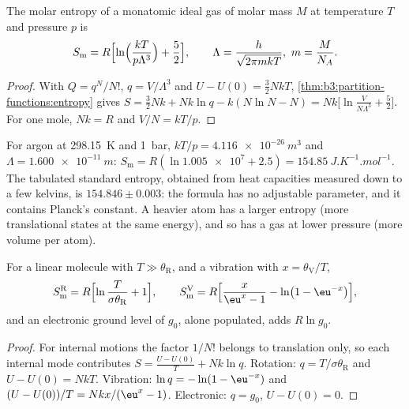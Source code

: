 \begin{theorem}\label{thm:b3:partition-functions:sackur-tetrode}
The molar entropy of a monatomic ideal gas of molar mass $M$ at temperature $T$
and pressure $p$ is
\[
  S_{\mathrm m} = R\Bigl[\ln\Bigl(\frac{kT}{p\Lambda^3}\Bigr) + \frac52\Bigr],
  \qquad \Lambda = \frac{h}{\sqrt{2\pi mkT}},\ m = \frac{M}{N_A}.
\]
\end{theorem}

\begin{proof}
With $Q = q^N/N!$, $q = V/\Lambda^3$ and $U - U(0) = \frac32NkT$,
\cref{thm:b3:partition-functions:entropy} gives $S = \frac32Nk + Nk\ln q - k(N\ln N - N) =
Nk\bigl[\ln\frac{V}{N\Lambda^3} + \frac52\bigr]$. For one mole, $Nk = R$ and $V/N = kT/p$.
\end{proof}

For argon at \qty{298.15}{K} and \qty{1}{bar}, $kT/p = \qty{4.116e-26}{m^3}$ and $\Lambda =
\qty{1.600e-11}{m}$: $S_{\mathrm m} = R(\ln\num{1.005e7} + 2.5) = \qty{154.85}{J.K^{-1}.mol^{-1}}$. The
tabulated standard entropy, obtained from heat capacities measured down to a
few kelvins, is $154.846 \pm 0.003$: the formula has no adjustable parameter, and
it contains Planck's constant. A heavier atom has a larger entropy (more
translational states at the same energy), and so has a gas at lower pressure
(more volume per atom).

\begin{proposition}\label{prop:b3:partition-functions:modes-entropy}
For a linear molecule with $T \gg \theta_{\mathrm R}$, and a vibration with $x = \theta_{\mathrm V}/T$,
\[
  S^{\mathrm R}_{\mathrm m} = R\Bigl[\ln\frac{T}{\sigma\theta_{\mathrm R}} + 1\Bigr],
  \qquad
  S^{\mathrm V}_{\mathrm m} = R\Bigl[\frac{x}{\eu^x - 1} - \ln\bigl(1 - \eu^{-x}\bigr)\Bigr],
\]
and an electronic ground level of  $g_0$, alone populated, adds $R\ln g_0$.
\end{proposition}

\begin{proof}
For internal motions the factor $1/N!$ belongs to translation only, so each
internal mode contributes $S = \frac{U - U(0)}{T} + Nk\ln q$. Rotation:
$q = T/\sigma\theta_{\mathrm R}$ and $U - U(0) = NkT$. Vibration: $\ln q = -\ln(1 - \eu^{-x})$ and
$(U - U(0))/T = Nkx/(\eu^x - 1)$. Electronic: $q = g_0$, $U - U(0) = 0$.
\end{proof}

